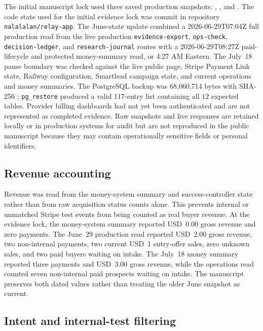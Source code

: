 \documentclass[12pt,letterpaper]{article}
\begin{document}
The initial manuscript lock used three saved production snapshots: \texttt{}, \texttt{}, and \texttt{}. The code state used for the initial evidence lock was commit \texttt{} in repository \texttt{nalalalan/relay-app}. The June-state update combined a 2026-06-29T07:04Z full production read from the live production \texttt{evidence-export}, \texttt{ops-check}, \texttt{decision-ledger}, and \texttt{research-journal} routes with a 2026-06-29T08:27Z paid-lifecycle and protected money-summary read, or 4:27 AM Eastern. The July~18 pause boundary was checked against the live public page, Stripe Payment Link state, Railway configuration, Smartlead campaign state, and current operations and money summaries. The PostgreSQL backup was 68,060,714 bytes with SHA-256 \texttt{}; \texttt{pg\_restore} produced a valid 117-entry list containing all 12 expected tables. Provider billing dashboards had not yet been authenticated and are not represented as completed evidence. Raw snapshots and live responses are retained locally or in production systems for audit but are not reproduced in the public manuscript because they may contain operationally sensitive fields or personal identifiers.

\subsection{Revenue accounting}

Revenue was read from the money-system summary and success-controller state rather than from raw acquisition status counts alone. This prevents internal or unmatched Stripe test events from being counted as real buyer revenue. At the evidence lock, the money-system summary reported USD~0.00 gross revenue and zero payments. The June~29 production read reported USD~2.00 gross revenue, two non-internal payments, two current USD~1 entry-offer sales, zero unknown sales, and two paid buyers waiting on intake. The July~18 money summary reported three payments and USD~3.00 gross revenue, while the operations read counted seven non-internal paid prospects waiting on intake. The manuscript preserves both dated values rather than treating the older June snapshot as current.

\subsection{Intent and internal-test filtering}
\end{document}
